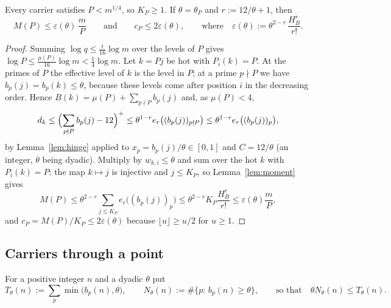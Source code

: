 \begin{lemma}\label{lem:carried}
Every carrier satisfies $P<m^{1/4}$, so $K_P\ge1$. If $\theta=\theta_P$ and $r:=12/\theta+1$, then
\begin{equation}\label{eq:carried}
M(P)\le\varepsilon(\theta)\,\frac mP\qquad\text{and}\qquad c_P\le2\varepsilon(\theta),\qquad\text{where}\quad
\varepsilon(\theta):=\theta^{2-r}\,\frac{H_B^r}{r!}.
\end{equation}
\end{lemma}
\begin{proof}
Summing $\log q\le\tfrac t{16}\log m$ over the levels of $P$ gives $\log P\le\tfrac{\mu(P)}{16}\log m<\tfrac14\log m$. Let $k=Pj$ be
hot with $P_i(k)=P$. At the primes of $P$ the effective level of $k$ is the level in $P$; at a prime $p\nmid P$ we have
$b_p(j)=b_p(k)\le\theta$, because these levels come after position $i$ in the decreasing order. Hence
$B(k)=\mu(P)+\sum_{p\nmid P}b_p(j)$ and, as $\mu(P)<4$,
\[
d_k\le\Bigl(\sum_{p\nmid P}b_p(j)-12\Bigr)^+\le\theta^{1-r}e_r\bigl((b_p(j))_{p\nmid P}\bigr)\le\theta^{1-r}e_r\bigl((b_p(j))_p\bigr),
\]
by Lemma~\ref{lem:hinge} applied to $x_p=b_p(j)/\theta\in[0,1]$ and $C=12/\theta$ (an integer, $\theta$ being dyadic). Multiply by
$w_{k,i}\le\theta$ and sum over the hot $k$ with $P_i(k)=P$: the map $k\mapsto j$ is injective and $j\le K_P$, so Lemma~\ref{lem:moment} gives
\[
M(P)\le\theta^{2-r}\sum_{j\le K_P}e_r\bigl((b_p(j))_p\bigr)\le\theta^{2-r}K_P\frac{H_B^r}{r!}\le\varepsilon(\theta)\frac mP ,
\]
and $c_P=M(P)/K_P\le2\varepsilon(\theta)$ because $\lfloor u\rfloor\ge u/2$ for $u\ge1$.
\end{proof}

\subsection*{Carriers through a point}

For a positive integer $n$ and a dyadic $\theta$ put
\[
T_\theta(n):=\sum_p\min\bigl(b_p(n),\theta\bigr),\qquad N_\theta(n):=\#\{p:\,b_p(n)\ge\theta\},\qquad\text{so that}\quad\theta N_\theta(n)\le T_\theta(n).
\]

